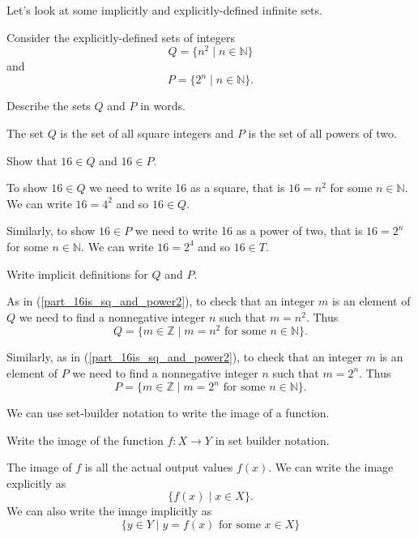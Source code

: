 Let's look at some implicitly and explicitly-defined infinite sets.

\begin{exam}
\label{exam_sq_powers2} 
    Consider the explicitly-defined sets of integers
        $$Q = \{ n^2 \mid n \in \mathbb{N}\}$$
    and
        $$P = \{ 2^n \mid n \in \mathbb{N}\}.$$
        \begin{apart}
            \item Describe the sets $Q$ and $P$ in words.
                \begin{soln}
                    The set $Q$ is the set of all square integers and $P$ is the set of all powers of two.
                \end{soln}
            \item \label{part_16is_sq_and_power2} Show that $16 \in Q$ and $16 \in P$.
                \begin{soln}
                    To show $16 \in Q$ we need to write 16 as a square, that is $16=n^2$ for some $n \in \mathbb{N}$.  We can write $16=4^2$ and so $16 \in Q$.

                    Similarly, to show $16 \in P$ we need to write 16 as a power of two, that is $16=2^n$ for some $n \in \mathbb{N}$.  We can write $16=2^4$ and so $16 \in T$.
                \end{soln}
            \item Write implicit definitions for $Q$ and $P$.
                \begin{soln}
                    As in (\ref{part_16is_sq_and_power2}), to check that an integer $m$ is an element of $Q$ we need to find a nonnegative integer $n$ such that $m=n^2$.  Thus 
                        $$Q = \{ m \in \mathbb{Z} \mid m=n^2 \text{ for some } n \in \mathbb{N}\}.$$

                    Similarly, as in (\ref{part_16is_sq_and_power2}), to check that an integer $m$ is an element of $P$ we need to find a nonnegative integer $n$ such that $m=2^n$.  Thus 
                        $$P = \{ m \in \mathbb{Z} \mid m=2^n \text{ for some } n \in \mathbb{N}\}.$$
                \end{soln}
        \end{apart}
\end{exam}

We can use set-builder notation to write the image of a function.

\begin{exam}
\label{exam_image_setbuilder}
    Write the image of the function $f: X \to Y$ in set builder notation.
        \begin{soln}
            The image of $f$ is all the actual output values $f(x)$.  We can write the image explicitly as     $$\{f(x) \mid x \in X\}.$$
            We can also write the image implicitly as
                $$\{y \in Y \mid y = f(x) \text{ for some }x \in X\}$$
        \end{soln}
\end{exam}

